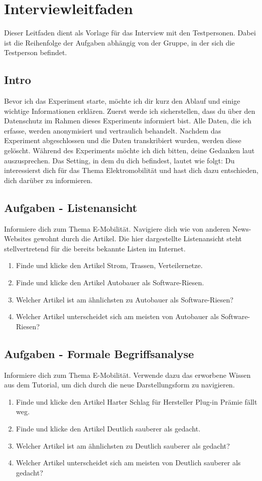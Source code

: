 \section{Interviewleitfaden}
Dieser Leitfaden dient als Vorlage für das Interview mit den Testpersonen.
Dabei ist die Reihenfolge der Aufgaben abhängig von der Gruppe, in der sich die Testperson befindet.

\subsection{Intro}
Bevor ich das Experiment starte, möchte ich dir kurz den Ablauf und einige wichtige Informationen erklären. 
Zuerst werde ich sicherstellen, dass du über den Datenschutz im Rahmen dieses Experiments informiert bist.
Alle Daten, die ich erfasse, werden anonymisiert und vertraulich behandelt.
Nachdem das Experiment abgeschlossen und die Daten transkribiert wurden, werden diese gelöscht.
Während des Experiments möchte ich dich bitten, deine Gedanken laut auszusprechen.
Das Setting, in dem du dich befindest, lautet wie folgt: \glqq Du interessierst dich für das Thema Elektromobilität und hast dich dazu entschieden, dich darüber zu informieren.\grqq{}

\subsection{Aufgaben - Listenansicht}
Informiere dich zum Thema E-Mobilität.
Navigiere dich wie von anderen News-Websites gewohnt durch die Artikel.
Die hier dargestellte Listenansicht steht stellvertretend für die bereits bekannte Listen im Internet.
\begin{enumerate}
    \item Finde und klicke den Artikel \glqq Strom, Trassen, Verteilernetze\grqq{}.
    \item Finde und klicke den Artikel \glqq Autobauer als Software-Riesen\grqq{}.
    \item Welcher Artikel ist am ähnlichsten zu \glqq Autobauer als Software-Riesen\grqq{}?
    \item Welcher Artikel unterscheidet sich am meisten von \glqq Autobauer als Software-Riesen\grqq{}?
\end{enumerate}

\subsection{Aufgaben - Formale Begriffsanalyse}
Informiere dich zum Thema E-Mobilität.
Verwende dazu das erworbene Wissen aus dem Tutorial, um dich durch die neue Darstellungsform zu navigieren.
\begin{enumerate}
    \item Finde und klicke den Artikel \glqq Harter Schlag für Hersteller Plug-in Prämie fällt weg\grqq{}.
    \item Finde und klicke den Artikel \glqq Deutlich sauberer als gedacht\grqq{}.
    \item Welcher Artikel ist am ähnlichsten zu \glqq Deutlich sauberer als gedacht\grqq{}?
    \item Welcher Artikel unterscheidet sich am meisten von \glqq Deutlich sauberer als gedacht\grqq{}?
\end{enumerate}